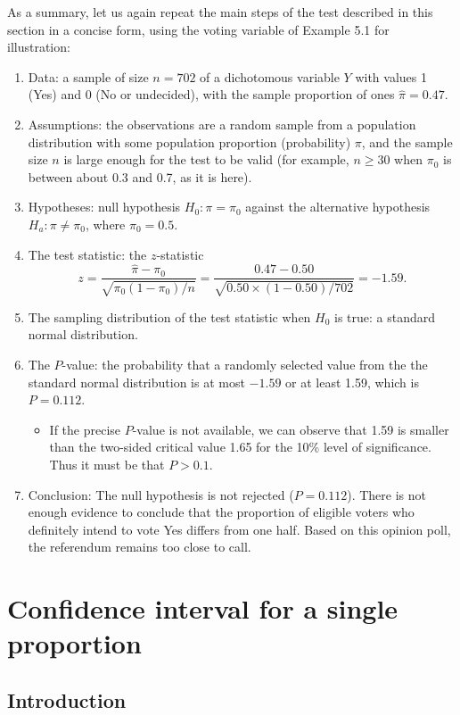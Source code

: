 As a summary, let us again repeat the main steps of the test described in this section
in a concise form, using the voting variable of
Example 5.1 for
illustration:
\begin{enumerate}
\item
Data: a sample of size $n=702$ of a dichotomous variable $Y$ with values
1 (Yes) and 0 (No or undecided), with the sample proportion
of ones $\hat{\pi}=0.47$.
\item
Assumptions: the observations are a random sample
from a population distribution with some
population proportion (probability) $\pi$, and the sample size $n$ is
large enough for the test to be valid
(for example, $n\ge 30$ when $\pi_{0}$ is between about 0.3 and 0.7, as it is here).
\item
Hypotheses: null hypothesis $H_{0}: \pi=\pi_{0}$ against the alternative
hypothesis $H_{a}: \pi\ne \pi_{0}$, where $\pi_{0}=0.5$.
\item
The test statistic: the $z$-statistic
\[
z=\frac{\hat{\pi}-\pi_{0}}{\sqrt{\pi_{0}(1-\pi_{0})/n}}=
\frac{0.47-0.50}{\sqrt{0.50\times(1-0.50)/702}}=-1.59.
\]
\item
The sampling distribution of the test statistic when $H_{0}$ is true: a
standard normal distribution.
\item
The $P$-value: the probability that a randomly selected value from the
the standard normal distribution is at most $-1.59$ or at least 1.59,
which is $P=0.112$.
\begin{itemize}
\item
If the precise $P$-value is not available,
we can observe that 1.59 is smaller than the
two-sided critical value 1.65 for the 10\% level of significance. Thus
it must be that $P>0.1$.
\end{itemize}
\item
Conclusion: The null hypothesis is not rejected ($P=0.112$).
There is not enough evidence to conclude that the proportion of eligible
voters who definitely intend to vote Yes differs from one half. Based on this
opinion poll, the referendum remains too close to
call.
\end{enumerate}

\section{Confidence interval for a single proportion}
\label{s_probs_1sampleci}

\subsection{Introduction}
\label{s_probs_1sampleci_intro}

